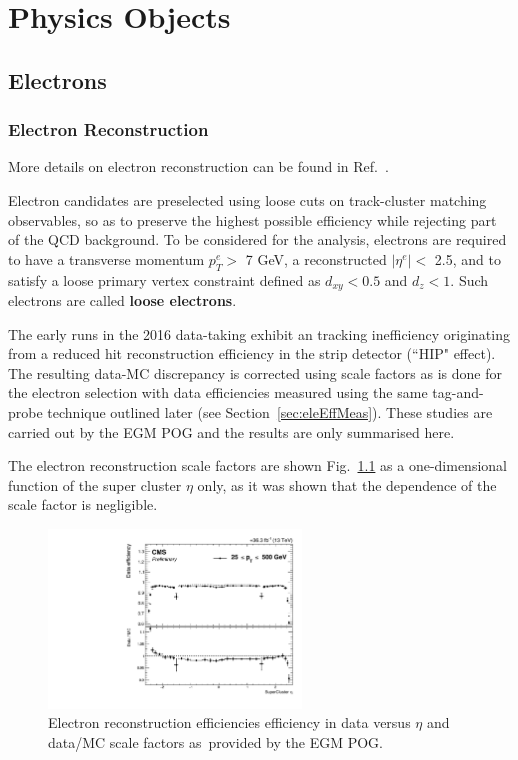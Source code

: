 \chapter{Physics Objects}\label{sec:objects}

\section{Electrons}

\subsection{Electron Reconstruction}
\label{sec:eleReco}

More details on electron reconstruction can be found in Ref.~\cite{ElectronLegacy}. 

Electron candidates are preselected using loose cuts on track-cluster matching observables, so as to preserve the highest possible efficiency while rejecting part of the QCD background. To be considered for the analysis, electrons are required to have a
transverse momentum $p^e_T >$ 7 GeV, a reconstructed $|\eta^e| <$ 2.5, and to satisfy a loose primary vertex 
constraint defined as $d_{xy} < 0.5$ and $d_z < 1$. 
Such electrons are called {\bf loose electrons}.

The early runs in the 2016 data-taking exhibit an tracking inefficiency originating from a reduced hit reconstruction efficiency in the strip detector (``HIP" effect). 
The resulting data-MC discrepancy is corrected using scale factors as is done for the electron selection with data efficiencies measured using the same tag-and-probe technique outlined later (see Section~\ref{sec:eleEffMeas}). 
These studies are carried out by the EGM POG and the results are only summarised here.

The electron reconstruction scale factors are shown Fig.~\ref{fig:ele_rec_scale_factors} as a one-dimensional function of the super cluster $\eta$ only, as it was shown that the \pt dependence of the scale factor is negligible.

\begin{figure}[!htb]
\vspace*{0.3cm}
\begin{center}
\includegraphics[width=0.6\textwidth]{Figures/Electrons/ele_rec_scale_factors.pdf}
\end{center}
\caption{Electron reconstruction efficiencies efficiency in data versus $\eta$ and data/MC scale factors as provided by the EGM POG.}
\label{fig:ele_rec_scale_factors}
\end{figure}

